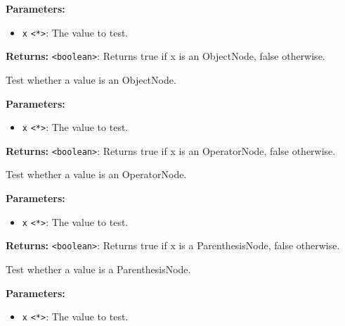 \documentclass[12pt,a4paper]{article}
\begin{document}
\noindent \textbf{Parameters:}
\begin{itemize}
  \item \texttt{x} \texttt{<*>}: The value to test.
\end{itemize}

\noindent \textbf{Returns:} \texttt{<boolean>}: Returns true if \textasciigrave{}x\textasciigrave{} is an ObjectNode, false otherwise.

\noindent Test whether a value is an ObjectNode.

\vspace{5mm}
\noindent {}


\noindent \textbf{Parameters:}
\begin{itemize}
  \item \texttt{x} \texttt{<*>}: The value to test.
\end{itemize}

\noindent \textbf{Returns:} \texttt{<boolean>}: Returns true if \textasciigrave{}x\textasciigrave{} is an OperatorNode, false otherwise.

\noindent Test whether a value is an OperatorNode.

\vspace{5mm}
\noindent {}


\noindent \textbf{Parameters:}
\begin{itemize}
  \item \texttt{x} \texttt{<*>}: The value to test.
\end{itemize}

\noindent \textbf{Returns:} \texttt{<boolean>}: Returns true if \textasciigrave{}x\textasciigrave{} is a ParenthesisNode, false otherwise.

\noindent Test whether a value is a ParenthesisNode.

\vspace{5mm}
\noindent {}


\noindent \textbf{Parameters:}
\begin{itemize}
  \item \texttt{x} \texttt{<*>}: The value to test.
\end{itemize}
\end{document}
